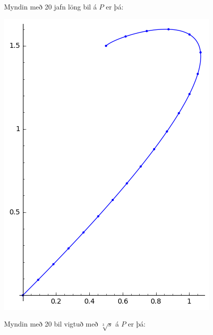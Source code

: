 \documentclass{article}
\begin{document}
\vspace*{0.5cm}

Myndin með 20 jafn löng bil á $P$ er þá: \\

\begin{center}
\includegraphics[scale=0.7]{20pt0}
\end{center}

\vspace*{0.5cm}

Myndin með 20 bil vigtuð með $\sqrt[3]{s}$ á $P$ er þá: \\
\end{document}
